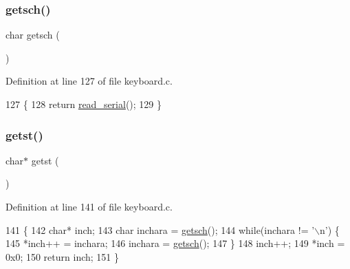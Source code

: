\subsubsection{\texorpdfstring{getsch()}{getsch()}}
{\footnotesize\ttfamily char getsch (\begin{DoxyParamCaption}{ }\end{DoxyParamCaption})}



Definition at line 127 of file keyboard.\+c.


\begin{DoxyCode}
127               \{
128     \textcolor{keywordflow}{return} \hyperlink{a00056_ad343a7018f74662f794968dfa0523841_ad343a7018f74662f794968dfa0523841}{read\_serial}();
129 \}
\end{DoxyCode}
\mbox{\label{a00038_ab88a2e96bbe585e228a5b201435c0240_ab88a2e96bbe585e228a5b201435c0240}} 
\subsubsection{\texorpdfstring{getst()}{getst()}}
{\footnotesize\ttfamily char$\ast$ getst (\begin{DoxyParamCaption}{ }\end{DoxyParamCaption})}



Definition at line 141 of file keyboard.\+c.


\begin{DoxyCode}
141               \{
142     \textcolor{keywordtype}{char}* inch;
143     \textcolor{keywordtype}{char} inchara = \hyperlink{a00038_aa7ee03b27a489828ce588d0fc023cab3_aa7ee03b27a489828ce588d0fc023cab3}{getsch}();
144     \textcolor{keywordflow}{while}(inchara != \textcolor{charliteral}{'\(\backslash\)n'}) \{
145         *inch++ = inchara;
146         inchara = \hyperlink{a00038_aa7ee03b27a489828ce588d0fc023cab3_aa7ee03b27a489828ce588d0fc023cab3}{getsch}();
147     \}
148     inch++;
149     *inch = 0x0;
150     \textcolor{keywordflow}{return} inch;
151 \}
\end{DoxyCode}
\mbox{\label{a00038_aabdb223e5290f3b3c07bc82d075b87d7_aabdb223e5290f3b3c07bc82d075b87d7}} 

